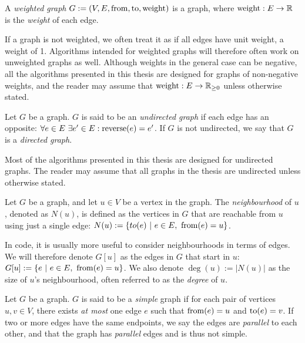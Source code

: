 \begin{definition}
    A \emph{weighted graph} $G := (V, E, \operatorname{from}, \operatorname{to}, \operatorname{weight})$ is a graph, where $\operatorname{weight} : E \rightarrow \mathbb{R}$ is the \emph{weight} of each edge. 
\end{definition}

If a graph is not weighted, we often treat it as if all edges have unit weight, a weight of 1. Algorithms intended for weighted graphs will therefore often work on unweighted graphs as well. Although weights in the general case can be negative, all the algorithms presented in this thesis are designed for graphs of non-negative weights, and the reader may assume that $\operatorname{weight} : E \rightarrow \mathbb{R}_{\geq0}$ unless otherwise stated.

\begin{definition}
    Let $G$ be a graph. $G$ is said to be an \emph{undirected graph} if each edge has an opposite: $\forall e \in E ~ \exists e' \in E : \operatorname{reverse}(e) = e'$.
    If $G$ is not undirected, we say that $G$ is a \emph{directed graph}.
\end{definition}
Most of the algorithms presented in this thesis are designed for undirected graphs. The reader may assume that all graphs in the thesis are undirected unless otherwise stated.

\begin{definition}[Neighbourhood]
    Let $G$ be a graph, and let $u \in V$ be a vertex in the graph. The \emph{neighbourhood} of $u$, denoted as $N(u)$, is defined as the vertices in $G$ that are reachable from $u$ using just a single edge: $N(u) := \{ to(e)  ~|~  e \in E, ~ \operatorname{from}(e) = u\}$. 
\end{definition}
In code, it is usually more useful to consider neighbourhoods in terms of edges. We will therefore denote $G[u]$ as the edges in $G$ that start in $u$: $G[u] := \{e ~ | ~ e \in E, ~ \operatorname{from}(e) = u\}$. We also denote $\deg(u) := |N(u)|$ as the size of $u$'s neighbourhood, often referred to as the \emph{degree} of $u$.

\begin{definition}
    Let $G$ be a graph. $G$ is said to be a \emph{simple} graph if for each pair of vertices $u,v \in V$, there exists \emph{at most} one edge $e$ such that $\operatorname{from}(e) = u$ and $\operatorname{to}(e) = v$. If two or more edges have the same endpoints, we say the edges are \emph{parallel} to each other, and that the graph has \emph{parallel} edges and is thus not simple.
\end{definition}

